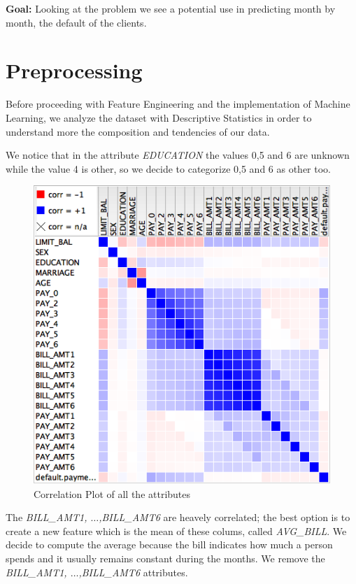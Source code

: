 \documentclass[fleqn,10pt]{SelfArx} %
\begin{document}
	
	\textbf{Goal:}\newline
	Looking at the problem we see a potential use in predicting month by month, the default of the clients.
	
	\section{Preprocessing}
	Before proceeding with Feature Engineering and the  implementation of Machine Learning, we analyze the dataset with Descriptive Statistics in order to understand more the composition and tendencies of our data.
	
	We notice that in the attribute \textit{EDUCATION} the values 0,5 and 6 are unknown while the value 4 is other, so we decide to categorize 0,5 and 6 as other too.
	\begin{figure}[h]
		\includegraphics[width=\linewidth]{correlation.png}
		\caption{Correlation Plot of all the attributes}
	\end{figure}
	
	
	The \textit{BILL\_AMT1, $\hdots$,BILL\_AMT6} are heavely correlated; the best option is to create a new feature which is the mean of these colums, called \textit{AVG\_BILL}.
	We decide to compute the average because the bill indicates how much a person spends and it usually remains constant during the months. We remove the \textit{BILL\_AMT1, $\hdots$,BILL\_AMT6} attributes.
	
\end{document}
